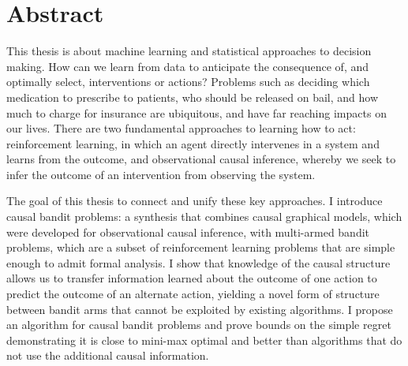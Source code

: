\chapter*{Abstract}

This thesis is about machine learning and statistical approaches to decision making. How can we learn from data to anticipate the consequence of, and optimally select, interventions or actions? Problems such as deciding which medication to prescribe to patients, who should be released on bail, and how much to charge for insurance are ubiquitous, and have far reaching impacts on our lives. There are two fundamental approaches to learning how to act: reinforcement learning, in which an agent directly intervenes in a system and learns from the outcome, and observational causal inference, whereby we seek to infer the outcome of an intervention from observing the system. 

The goal of this thesis to connect and unify these key approaches. I introduce causal bandit problems: a synthesis that combines causal graphical models, which were developed for observational causal inference, with multi-armed bandit problems, which are a subset of reinforcement learning problems that are simple enough to admit formal analysis. I show that knowledge of the causal structure allows us to transfer information learned about the outcome of one action to predict the outcome of an alternate action, yielding a novel form of structure between bandit arms that cannot be exploited by existing algorithms. I propose an algorithm for causal bandit problems and prove bounds on the simple regret demonstrating it is close to mini-max optimal and better than algorithms that do not use the additional causal information. 


